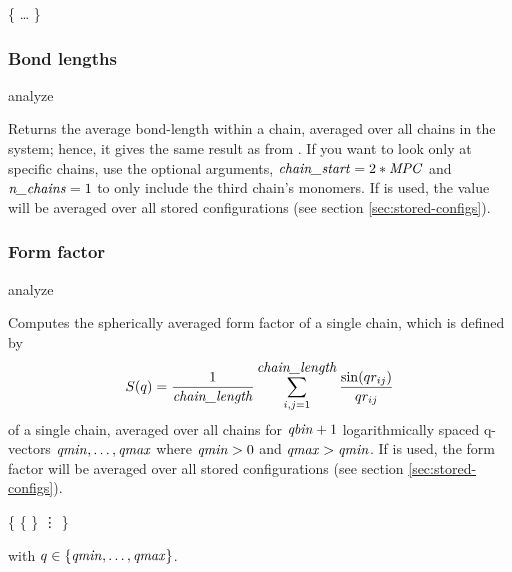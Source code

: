 \begin{essyntex}
\begin{code}
\{   \dots {} \}
\end{code}

\subsubsection{Bond lengths}
\begin{essyntax}
  analyze  
\end{essyntax}
Returns the average bond-length within a chain, averaged over all
chains in the system; hence, it gives the same result as 
from . If you want to look only at specific
chains, use the optional arguments, \ie $\mbox{\textrm{\textit{chain\_start}}} =
2*\mbox{\textrm{\textit{MPC}}}$ and $\mbox{\textrm{\textit{n\_chains}}} = 1$ to only include the third
chain's monomers. If  is used, the value will be
averaged over all stored configurations (see section
\vref{sec:stored-configs}).

\subsubsection{Form factor}
\begin{essyntax}
  analyze  
    \\
\end{essyntax}

Computes the spherically averaged form factor of a single chain, which
is defined by
\begin{equation}
  S(q) = \frac{1}{\mbox{\textrm{\textit{chain\_length}}}} \sum_{i,j=1}^{\mbox{\textrm{\textit{chain\_length}}}}
  \frac{\sin(q r_{ij})}{q r_{ij}}
\end{equation}
of a single chain, averaged over all chains for $\mbox{\textrm{\textit{qbin}}}+1$
logarithmically spaced q-vectors $\mbox{\textrm{\textit{qmin}}}, \dots ,\mbox{\textrm{\textit{qmax}}}$ where
$\mbox{\textrm{\textit{qmin}}}>0$ and $\mbox{\textrm{\textit{qmax}}}>\mbox{\textrm{\textit{qmin}}}$.  If  is
used, the form factor will be averaged over all stored configurations
(see section \vref{sec:stored-configs}).


\begin{code}
\{
  \{   \}
  \vdots
\}
\end{code}
with $q \in \{\mbox{\textrm{\textit{qmin}}},\dots,\mbox{\textrm{\textit{qmax}}}\}$.


\end{essyntex}
